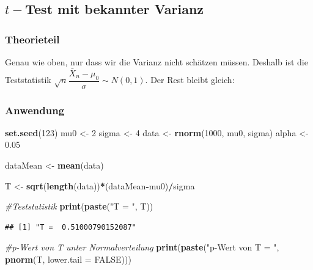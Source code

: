 \documentclass[]{article}
\newenvironment{Shaded}{\begin{snugshade}}{\end{snugshade}}
\newcommand{\CommentTok}[1]{\textcolor[rgb]{0.56,0.35,0.01}{\textit{#1}}}
\newcommand{\DataTypeTok}[1]{\textcolor[rgb]{0.13,0.29,0.53}{#1}}
\newcommand{\DecValTok}[1]{\textcolor[rgb]{0.00,0.00,0.81}{#1}}
\newcommand{\FloatTok}[1]{\textcolor[rgb]{0.00,0.00,0.81}{#1}}
\newcommand{\KeywordTok}[1]{\textcolor[rgb]{0.13,0.29,0.53}{\textbf{#1}}}
\newcommand{\NormalTok}[1]{#1}
\newcommand{\OperatorTok}[1]{\textcolor[rgb]{0.81,0.36,0.00}{\textbf{#1}}}
\newcommand{\OtherTok}[1]{\textcolor[rgb]{0.56,0.35,0.01}{#1}}
\newcommand{\StringTok}[1]{\textcolor[rgb]{0.31,0.60,0.02}{#1}}
\begin{document}
\hypertarget{t-test-mit-bekannter-varianz}{%
\subsection{\texorpdfstring{\(t-\)Test mit bekannter Varianz}{t-Test mit bekannter Varianz}}\label{t-test-mit-bekannter-varianz}}

\hypertarget{theorieteil-2}{%
\subsubsection{Theorieteil}\label{theorieteil-2}}

\citep{wikipediaT}
Genau wie oben, nur dass wir die Varianz nicht schätzen müssen.
Deshalb ist die Teststatistik \(\sqrt{n}\dfrac{\bar X_n-\mu_0}{\sigma}\sim N(0,1)\).
Der Rest bleibt gleich:

\hypertarget{anwendung-2}{%
\subsubsection{Anwendung}\label{anwendung-2}}

\begin{Shaded}
\begin{Highlighting}[]
\KeywordTok{set.seed}\NormalTok{(}\DecValTok{123}\NormalTok{)}
\NormalTok{mu0 <-}\StringTok{ }\DecValTok{2}
\NormalTok{sigma <-}\StringTok{ }\DecValTok{4}
\NormalTok{data <-}\StringTok{ }\KeywordTok{rnorm}\NormalTok{(}\DecValTok{1000}\NormalTok{, mu0, sigma)}
\NormalTok{alpha <-}\StringTok{ }\FloatTok{0.05}

\NormalTok{dataMean <-}\StringTok{ }\KeywordTok{mean}\NormalTok{(data)}

\NormalTok{T <-}\StringTok{ }\KeywordTok{sqrt}\NormalTok{(}\KeywordTok{length}\NormalTok{(data))}\OperatorTok{*}\NormalTok{(dataMean}\OperatorTok{-}\NormalTok{mu0)}\OperatorTok{/}\NormalTok{sigma}

\CommentTok{#Teststatistik}
\KeywordTok{print}\NormalTok{(}\KeywordTok{paste}\NormalTok{(}\StringTok{"T = "}\NormalTok{, T))}
\end{Highlighting}
\end{Shaded}

\begin{verbatim}
## [1] "T =  0.51000790152087"
\end{verbatim}

\begin{Shaded}
\begin{Highlighting}[]
\CommentTok{#p-Wert von T unter Normalverteilung}
\KeywordTok{print}\NormalTok{(}\KeywordTok{paste}\NormalTok{(}\StringTok{"p-Wert von T = "}\NormalTok{, }\KeywordTok{pnorm}\NormalTok{(T, }\DataTypeTok{lower.tail =} \OtherTok{FALSE}\NormalTok{)))}
\end{Highlighting}
\end{Shaded}
\end{document}
